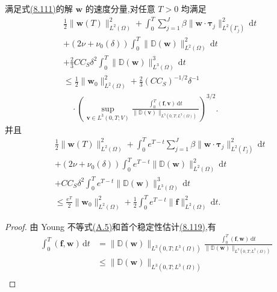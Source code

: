 \begin{lemma}[对 $\nu$ 一致的稳定性估计]
\label{lem:smagorinsky-uniform-stability}
满足式\hyperref[eq:smagorinsky-generalized-weak-form]{(8.111)}的解 $\bm{w}$ 的速度分量,对任意 $T>0$ 均满足
\begin{equation}\label{eq:smagorinsky-uniform-stability}
\begin{aligned}
 &\frac12\|\bm{w}(T)\|_{L^2(\Omega)}^2
 +\int_0^T\sum_{j=1}^J\beta
       \|\bm{w}\cdot\symbf{\tau}_j\|_{L^2(\Gamma_j)}^2\,\mathrm{d}t\\
 &+(2\nu+\nu_0(\delta))\int_0^T
       \|\mathbb{D}(\bm{w})\|_{L^2(\Omega)}^2\,\mathrm{d}t\\
 &+\frac23 C C_S\delta^2\int_0^T
       \|\mathbb{D}(\bm{w})\|_{L^3(\Omega)}^3\,\mathrm{d}t\\
 &\le \frac12\|\bm{w}_0\|_{L^2(\Omega)}^2
       +\frac23(CC_S)^{-1/2}\delta^{-1}\\
 &\quad\cdot\left(\sup_{\bm{v}\in L^3(0,T;V)}
       \frac{\int_0^T(\bm{f},\bm{v})\,\mathrm{d}t}
       {\|\mathbb{D}(\bm{v})\|_{L^3(0,T;L^3(\Omega))}}\right)^{3/2}.
\end{aligned}
\end{equation}
并且
\begin{equation}\label{eq:smagorinsky-weighted-stability}
\begin{aligned}
 &\frac12\|\bm{w}(T)\|_{L^2(\Omega)}^2
 +\int_0^T e^{T-t}\sum_{j=1}^J\beta
       \|\bm{w}\cdot\symbf{\tau}_j\|_{L^2(\Gamma_j)}^2\,\mathrm{d}t\\
 &+(2\nu+\nu_0(\delta))\int_0^T e^{T-t}
       \|\mathbb{D}(\bm{w})\|_{L^2(\Omega)}^2\,\mathrm{d}t\\
 &+C C_S\delta^2\int_0^T e^{T-t}
       \|\mathbb{D}(\bm{w})\|_{L^3(\Omega)}^3\,\mathrm{d}t\\
 &\le \frac{e^T}{2}\|\bm{w}_0\|_{L^2(\Omega)}^2
       +\frac12\int_0^T e^{T-t}\|\bm{f}\|_{L^2(\Omega)}^2\,\mathrm{d}t.
\end{aligned}
\end{equation}
\begin{proof}
由 Young 不等式\hyperref[eq:appendix-a-5]{(A.5)}和首个稳定性估计\hyperref[eq:smagorinsky-strain-energy-inequality]{(8.119)},有
\[
\begin{aligned}
 \int_0^T(\bm{f},\bm{w})\,\mathrm{d}t
 &=\|\mathbb{D}(\bm{w})\|_{L^3(0,T;L^3(\Omega))}
   \frac{\int_0^T(\bm{f},\bm{w})\,\mathrm{d}t}
        {\|\mathbb{D}(\bm{w})\|_{L^3(0,T;L^3(\Omega))}}\\
 &\le \|\mathbb{D}(\bm{w})\|_{L^3(0,T;L^3(\Omega))}\\

\end{aligned}\]
\end{proof}
\end{lemma}
